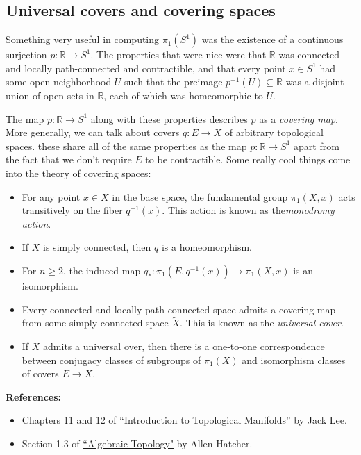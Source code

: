 \documentclass[10pt]{amsart}
\theoremstyle{definition}
\newcommand{\cdef}[1]{\textcolor{Bittersweet}{#1}}
\begin{document}
\subsection*{Universal covers and covering spaces}
Something very useful in computing $\pi_1(S^1)$ was the existence of a continuous surjection $p:\mathbb{R} \to S^1$. The properties that were nice were that $\mathbb{R}$ was connected and locally path-connected and contractible, and that every point $x \in S^1$ had some open neighborhood $U$ such that the preimage $p^{-1}(U) \subseteq \mathbb{R}$ was a disjoint union of open sets in $\mathbb{R}$, each of which was homeomorphic to $U$.

The map $p:\mathbb{R} \to S^1$ along with these properties describes $p$ as a \cdef{\emph{covering map}}. More generally, we can talk about covers $q:E \to X$ of arbitrary topological spaces. these share all of the same properties as the map $p:\mathbb{R} \to S^1$ apart from the fact that we don't require $E$ to be contractible. Some really cool things come into the theory of covering spaces:
\begin{itemize}
    \item For any point $x \in X$ in the base space, the fundamental group $\pi_1(X, x)$ acts transitively on the fiber $q^{-1}(x)$. This action is known as the\cdef{\emph{monodromy action}}.
    \item If $X$ is simply connected, then $q$ is a homeomorphism.
    \item For $n \geq 2$, the induced map $q_*:\pi_1(E, q^{-1}(x)) \to \pi_1(X, x)$ is an isomorphism.
    \item Every connected and locally path-connected space admits a covering map from some simply connected space $\tilde{X}$. This is known as the \cdef{\emph{universal cover}}.
    \item If $X$ admits a universal over, then there is a one-to-one correspondence between conjugacy classes of subgroups of $\pi_1(X)$ and isomorphism classes of covers $E \to X$.
\end{itemize}

\textbf{References:}
\begin{itemize}
    \item Chapters 11 and 12 of ``Introduction to Topological Manifolds'' by Jack Lee.
    \item Section 1.3 of \href{https://pi.math.cornell.edu/~hatcher/AT/AT.pdf}{``Algebraic Topology"} by Allen Hatcher.
\end{itemize}
\end{document}
